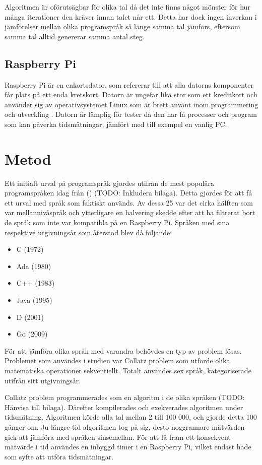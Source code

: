 \documentclass[12pt,swedish]{article}
\begin{document}
Algoritmen är oförutsägbar för olika tal då det inte finns något mönster för hur många iterationer den kräver innan talet når ett. Detta har dock ingen inverkan i jämförelser mellan olika programspråk så länge samma tal jämförs, eftersom samma tal alltid genererar samma antal steg. 

\subsection{Raspberry Pi}
Raspberry Pi är en enkortsdator, som refererar till att alla datorns komponenter får plats på ett enda kretskort. Datorn är ungefär lika stor som ett kreditkort och använder sig av operativsystemet Linux som är brett använt inom programmering och utveckling \citep{andrews_2013}. Datorn är lämplig för tester då den har få processer och program som kan påverka tidsmätningar, jämfört med till exempel en vanlig PC.


\newpage
\section{Metod}
Ett initialt urval på programspråk gjordes utifrån de mest populära programspråken idag från \citeauthor{tiobe} (\citeyear{tiobe}) (TODO: Inkludera bilaga). Detta gjordes för att få ett urval med språk som faktiskt används. Av dessa 25 var det cirka hälften som var mellannivåspråk och ytterligare en halvering skedde efter att ha filtrerat bort de språk som inte var kompatibla på en Raspberry Pi. Språken med sina respektive utgivningsår som återstod blev då följande:

\begin{itemize}
    \item C (1972)
    \item Ada (1980)
    \item C++ (1983)
    \item Java (1995)
    \item D (2001)
    \item Go (2009)
\end{itemize}
För att jämföra olika språk med varandra behövdes en typ av problem lösas. Problemet som användes i studien var Collatz problem som utförde olika matematiska operationer sekventiellt. Totalt användes sex språk, kategoriserade utifrån sitt utgivningsår.

Collatz problem programmerades som en algoritm i de olika språken (TODO: Hänvisa till bilaga).
Därefter kompilerades och exekverades algoritmen under tidsmätning. Algoritmen körde alla tal mellan 2 till 100 000, och gjorde detta 100 gånger om. Ju längre tid algoritmen tog på sig, desto noggrannare mätvärden gick att jämföra med språken sinsemellan. För att få fram ett konsekvent mätvärde i tid användes en inbyggd timer i en Raspberry Pi, vilket endast hade som syfte att utföra tidsmätningar.
\end{document}
